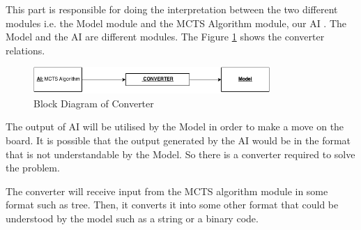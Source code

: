 This part is responsible for doing the interpretation between the two different modules i.e. the Model module and the MCTS Algorithm module, our AI . The Model and the AI are different modules. The Figure \ref{fig:flowchart} shows the converter relations.

\begin{figure}[H]
	\centering
	\includegraphics[width=0.80\textwidth]{2General_Architecture/2.2API/img/CONVERTER.png}
	\caption{Block Diagram of Converter}
	\label{fig:flowchart}
\end{figure}



The output of AI will be utilised by the Model in order to make a move on the board. It is possible that the output generated by the AI would be in the format that is not understandable by the Model. So there is a converter required to solve the problem.

The converter will receive input from the MCTS algorithm module in some format such as tree. Then, it converts it into some other format that could be understood by the model such as a string or a binary code.

